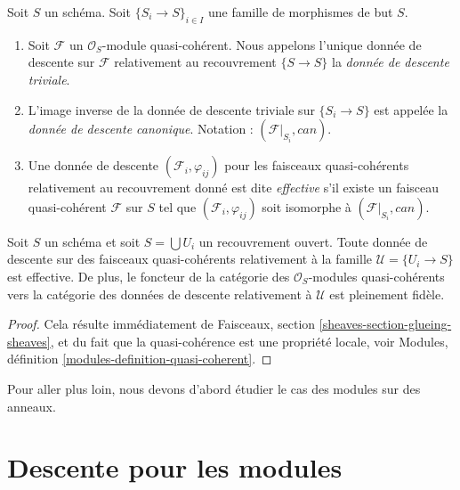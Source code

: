 \begin{definition}
\label{definition-descent-datum-effective-quasi-coherent}
Soit $S$ un schéma. Soit $\{S_i \to S\}_{i \in I}$ une famille de morphismes
de but $S$.
\begin{enumerate}
\item Soit $\mathcal{F}$ un $\mathcal{O}_S$-module quasi-cohérent. Nous
appelons l'unique donnée de descente sur $\mathcal{F}$ relativement au
recouvrement $\{S \to S\}$ la {\it donnée de descente triviale}.
\item L'image inverse de la donnée de descente triviale sur
$\{S_i \to S\}$ est appelée la {\it donnée de descente canonique}. Notation :
$(\mathcal{F}|_{S_i}, can)$.
\item Une donnée de descente $(\mathcal{F}_i, \varphi_{ij})$ pour les
faisceaux quasi-cohérents relativement au recouvrement donné est dite
{\it effective} s'il existe un faisceau quasi-cohérent $\mathcal{F}$ sur $S$
tel que $(\mathcal{F}_i, \varphi_{ij})$ soit isomorphe à
$(\mathcal{F}|_{S_i}, can)$.
\end{enumerate}
\end{definition}

\begin{lemma}
\label{lemma-zariski-descent-effective}
Soit $S$ un schéma et soit $S = \bigcup U_i$ un recouvrement ouvert. Toute
donnée de descente sur des faisceaux quasi-cohérents relativement à la famille
$\mathcal{U} = \{U_i \to S\}$ est effective. De plus, le foncteur de la
catégorie des $\mathcal{O}_S$-modules quasi-cohérents vers la catégorie des
données de descente relativement à $\mathcal{U}$ est pleinement fidèle.
\end{lemma}

\begin{proof}
Cela résulte immédiatement de Faisceaux, section
\ref{sheaves-section-glueing-sheaves}, et du fait que la quasi-cohérence est
une propriété locale, voir Modules, définition
\ref{modules-definition-quasi-coherent}.
\end{proof}

\noindent
Pour aller plus loin, nous devons d'abord étudier le cas des modules sur des
anneaux.










\section{Descente pour les modules}
\label{section-descent-modules}

